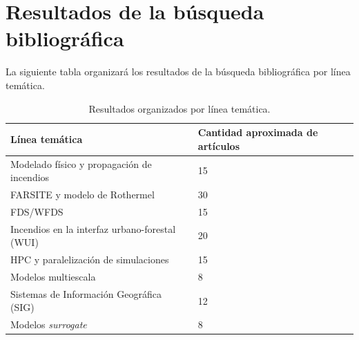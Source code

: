 \clearpage
\section{Resultados de la búsqueda bibliográfica}

La siguiente tabla organizará los resultados de la búsqueda bibliográfica por línea temática.

\begin{table}[H]
    \centering
    \renewcommand{\arraystretch}{2.5}
    \begin{tabular}{p{7.2cm}p{5.2cm}}
        \toprule
        \textbf{Línea temática} & \textbf{Cantidad aproximada de artículos} \\
        \midrule
        Modelado físico y propagación de incendios & 15\\
        FARSITE y modelo de Rothermel & 30 \\
        FDS/WFDS & 15 \\
        Incendios en la interfaz urbano-forestal (WUI) & 20 \\
        HPC y paralelización de simulaciones & 15 \\
        Modelos multiescala & 8 \\
        Sistemas de Información Geográfica (SIG) & 12 \\
        Modelos \textit{surrogate} & 8 \\
        \bottomrule
    \end{tabular}
    \caption{Resultados organizados por línea temática.}
\end{table}
